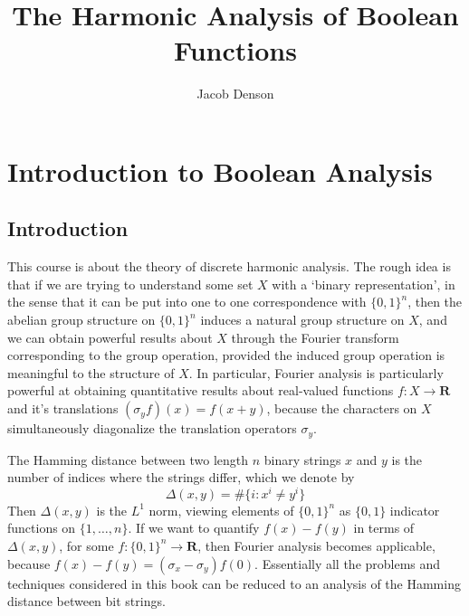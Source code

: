 

\title{The Harmonic Analysis of Boolean Functions}
\author{Jacob Denson}




\maketitle

\tableofcontents


\chapter{Introduction to Boolean Analysis}

\section{Introduction}

This course is about the theory of discrete harmonic analysis. The rough idea is that if we are trying to understand some set $X$ with a `binary representation', in the sense that it can be put into one to one correspondence with $\{ 0, 1 \}^n$, then the abelian group structure on $\{ 0, 1 \}^n$ induces a natural group structure on $X$, and we can obtain powerful results about $X$ through the Fourier transform corresponding to the group operation, provided the induced group operation is meaningful to the structure of $X$. In particular, Fourier analysis is particularly powerful at obtaining quantitative results about real-valued functions $f: X \to \mathbf{R}$ and it's translations $(\sigma_y f)(x) = f(x + y)$, because the characters on $X$ simultaneously diagonalize the translation operators $\sigma_y$.

\begin{example}
    The Hamming distance between two length $n$ binary strings $x$ and $y$ is the number of indices where the strings differ, which we denote by
    \[ \Delta(x,y) = \# \{ i : x^i \neq y^i \} \]
    Then $\Delta(x,y)$ is the $L^1$ norm, viewing elements of $\{ 0, 1 \}^n$ as $\{ 0, 1 \}$ indicator functions on $\{ 1, \dots, n \}$. If we want to quantify $f(x) - f(y)$ in terms of $\Delta(x,y)$, for some $f: \{ 0, 1 \}^n \to \mathbf{R}$, then Fourier analysis becomes applicable, because $f(x) - f(y) = (\sigma_x - \sigma_y) f(0)$. Essentially all the problems and techniques considered in this book can be reduced to an analysis of the Hamming distance between bit strings.
\end{example}

